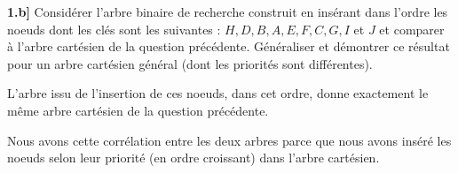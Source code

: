 \documentclass[a4paper,12pt]{report}
\begin{document}

\newpage
{}

\textbf{1.b]} Considérer l'arbre binaire de recherche construit en insérant dans l'ordre les noeuds dont les clés sont les suivantes : \( H, D, B, A, E, F, C, G, I \) et \( J \) et comparer à l'arbre cartésien de la question précédente. Généraliser et démontrer ce résultat pour un arbre cartésien général (dont les priorités sont différentes).\\



\begin{tcolorbox}[colback=gray!10, colframe=blue!30, coltitle=black, title=Réponse à la 1.b - 1/1]

    L'arbre issu de l'insertion de ces noeuds, dans cet ordre, donne exactement le même arbre cartésien de la question précédente.\\

    \begin{center}
    \end{center}

    Nous avons cette corrélation entre les deux arbres parce que nous avons inséré les noeuds selon leur priorité (en ordre croissant) dans l'arbre cartésien.


\end{tcolorbox}
\end{document}
